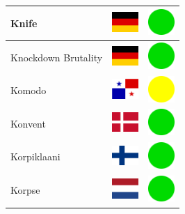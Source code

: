 \documentclass[12pt, a4paper, twoside]{report}
\begin{document}
\begin{center}
\begin{longtable}{|p{5cm}|p{2cm}|p{2cm}|}
 Knife                                                      & \includegraphics[width=1cm]{../4x3/de} &   \includegraphics[width=1cm]{../likes/y} \\ \hline
 Knockdown Brutality                                        & \includegraphics[width=1cm]{../4x3/de} &   \includegraphics[width=1cm]{../likes/y} \\ \hline
 Komodo                                                     & \includegraphics[width=1cm]{../4x3/pa} &   \includegraphics[width=1cm]{../likes/m} \\ \hline
 Konvent                                                    & \includegraphics[width=1cm]{../4x3/dk} &   \includegraphics[width=1cm]{../likes/y} \\ \hline
 Korpiklaani                                                & \includegraphics[width=1cm]{../4x3/fi} &   \includegraphics[width=1cm]{../likes/y} \\ \hline
 Korpse                                                     & \includegraphics[width=1cm]{../4x3/nl} &   \includegraphics[width=1cm]{../likes/y} \\ \hline

\end{longtable}
\end{center}
\end{document}
